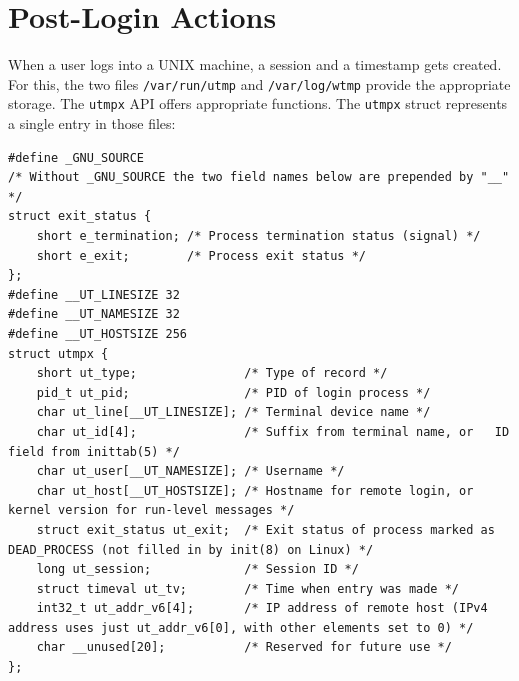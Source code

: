 \documentclass[10pt,a4paper,titlepage,twoside,english,final]{zhawreprt}
\begin{document}
\section{Post-Login Actions}\label{sec:PostLoginActions}
When a user logs into a \gls{UNIX} machine, a session and a timestamp gets created.\\
For this, the two files \texttt{/var/run/utmp} and \texttt{/var/log/wtmp} provide the appropriate storage. The \texttt{utmpx} \gls{API} offers appropriate functions. The \texttt{utmpx} struct represents a single entry in those files:
\setlistingC
\begin{lstlisting}[caption={Definition of the utmpx structure {\citep[p.819]{KerriskTLPI}}},label=lst:UtmpxDefinition]
#define _GNU_SOURCE
/* Without _GNU_SOURCE the two field names below are prepended by "__" */
struct exit_status {
	short e_termination; /* Process termination status (signal) */
	short e_exit; 		 /* Process exit status */
};
#define __UT_LINESIZE 32
#define __UT_NAMESIZE 32
#define __UT_HOSTSIZE 256
struct utmpx {
	short ut_type; 				 /* Type of record */
	pid_t ut_pid; 				 /* PID of login process */
	char ut_line[__UT_LINESIZE]; /* Terminal device name */
	char ut_id[4]; 				 /* Suffix from terminal name, or	ID field from inittab(5) */
	char ut_user[__UT_NAMESIZE]; /* Username */
	char ut_host[__UT_HOSTSIZE]; /* Hostname for remote login, or kernel version for run-level messages */
	struct exit_status ut_exit;  /* Exit status of process marked as DEAD_PROCESS (not filled in by init(8) on Linux) */
	long ut_session; 			 /* Session ID */
	struct timeval ut_tv; 		 /* Time when entry was made */
	int32_t ut_addr_v6[4]; 		 /* IP address of remote host (IPv4 address uses just ut_addr_v6[0], with other elements set to 0) */
	char __unused[20]; 			 /* Reserved for future use */
};
\end{lstlisting}
\end{document}
